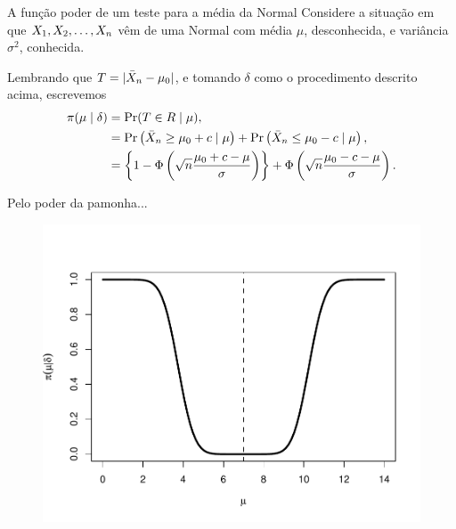 \begin{frame}{A função poder de um teste para a média da Normal}
 Considere a situação em que $X_1, X_2, \ldots, X_n$ vêm de uma Normal com média $\mu$, desconhecida, e variância $\sigma^2$, conhecida.
 \begin{exemplo}
  Lembrando que $T = |\bar{X}_n - \mu_0|$, e tomando $\delta$ como o procedimento descrito acima, escrevemos
  \begin{align*}
   \pi(\mu \mid \delta) &= \operatorname{Pr}(T \in R \mid \mu),\\
   &= \operatorname{Pr}\left(\bar{X}_n \geq \mu_0 + c \mid \mu \right) + \operatorname{Pr}\left( \bar{X}_n \leq \mu_0 -c \mid \mu \right),\\
   &= \left\{ 1 - \Phi\left(\sqrt{n} \frac{\mu_0 + c -\mu}{\sigma}\right) \right\} + \Phi\left(\sqrt{n} \frac{\mu_0 - c -\mu}{\sigma}\right). 
  \end{align*}
 \end{exemplo}
\end{frame}

\begin{frame}{Pelo poder da pamonha...}
\begin{figure}
 \begin{center}
  \includegraphics[scale=0.6]{figures/poder_palmirinha.pdf}
 \end{center}
\end{figure} 
\end{frame}
 
